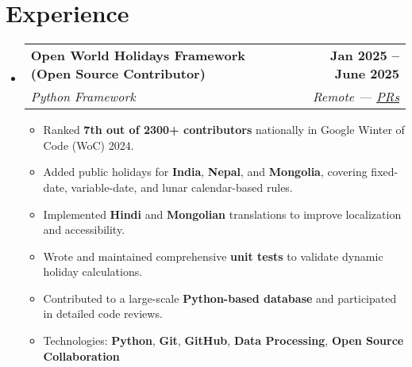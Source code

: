 \documentclass[letterpaper,11pt]{article}
\makeatletter
\newcommand{\resumeItem}[1]{
  \item\small{
    {#1 \vspace{-2pt}}
  }
}
\newcommand{\resumeSubheading}[4]{
  \vspace{-2pt}\item
    \begin{tabular*}{1.0\textwidth}[t]{l@{\extracolsep{\fill}}r}
      \vspace{-2pt}\textbf{#1} & \textbf{\small #2} \\
      \textit{\small#3} & \textit{\small #4} \\
    \end{tabular*}\vspace{-7pt}
}
\newcommand{\resumeSubHeadingListStart}{\begin{itemize}[leftmargin=0.0in, label={}]}
\newcommand{\resumeSubHeadingListEnd}{\end{itemize}}
\newcommand{\resumeItemListStart}{\begin{itemize}}
\newcommand{\resumeItemListEnd}{\end{itemize}\vspace{-5pt}}
\makeatother
\begin{document}
\section{Experience}
    \resumeSubHeadingListStart
        \resumeSubheading
        {Open World Holidays Framework (Open Source Contributor)}{Jan 2025 -- June 2025}
        {Python Framework}{Remote — \href{https://github.com/vacanza/holidays/pulls/ankushhKapoor}{\underline{PRs}}}
        \resumeItemListStart
            \resumeItem{Ranked \textbf{7th out of 2300+ contributors} nationally in Google Winter of Code (WoC) 2024.}
            \resumeItem{Added public holidays for \textbf{India}, \textbf{Nepal}, and \textbf{Mongolia}, covering fixed-date, variable-date, and lunar calendar-based rules.}
            \resumeItem{Implemented \textbf{Hindi} and \textbf{Mongolian} translations to improve localization and accessibility.}
            \resumeItem{Wrote and maintained comprehensive \textbf{unit tests} to validate dynamic holiday calculations.}
            \resumeItem{Contributed to a large-scale \textbf{Python-based database} and participated in detailed code reviews.}
            \resumeItem{Technologies: \textbf{Python}, \textbf{Git}, \textbf{GitHub}, \textbf{Data Processing}, \textbf{Open Source Collaboration}}
        \resumeItemListEnd
    \resumeSubHeadingListEnd
\vspace{-15pt}



\end{document}
